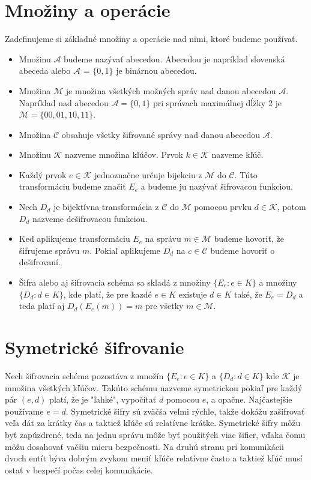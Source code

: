 \section{Množiny a operácie}
	Zadefinujeme si základné množiny a operácie nad nimi, ktoré budeme používať.
	\begin{itemize}
	\item Množinu $\mathcal A$ budeme nazývať abecedou. Abecedou je napríklad slovenská abeceda alebo $\mathcal A$ =  $\{0,1\}$ je binárnou abecedou.
	\item Množina $\mathcal M$ je množina všetkých možných správ nad danou abecedou $\mathcal A$. Napríklad nad abecedou $\mathcal A = \{0,1\}$ pri správach maximálnej dĺžky 2 je  $ \mathcal M = \{00,01,10,11\}$.
	\item Množina $\mathcal C$ obsahuje všetky šifrované správy nad danou abecedou $\mathcal A$.  
	\item Množinu $\mathcal K$ nazveme množina kľúčov. Prvok $k \in\mathcal K$ nazveme kľúč.
	\item Každý prvok $e \in \mathcal K$ jednoznačne určuje bijekciu z $\mathcal M$ do $\mathcal C$. Túto transformáciu budeme značiť $E_e$ a budeme ju nazývať šifrovacou funkciou.
	\item Nech $D_d$ je bijektívna transformácia z $\mathcal C$ do $\mathcal M$ pomocou prvku  $d \in \mathcal K$, potom  $D_d$ nazveme dešifrovacou funkciou.
	\item Keď aplikujeme transformáciu $E_e$ na správu $m \in \mathcal M$ budeme hovoriť, že šifrujeme správu $m$. Pokiaľ aplikujeme $D_d$ na $c \in \mathcal C$ budeme hovoriť o dešifrovaní.
	\item Šifra alebo aj šifrovacia schéma sa skladá z množiny $\{E_e : e \in K\}$ a množiny $\{D_d : d \in K\}$, kde platí, že pre kazdé $e \in K$ existuje $d \in K$ také, že $E_e = D_d$ a teda platí aj $D_d(E_e(m)) = m$ pre všetky $m \in \mathcal M$.  
	\end{itemize}

		
\section{Symetrické šifrovanie}
	Nech šifrovacia schéma pozostáva z množín $\{E_e : e \in K\}$ a $\{D_d: d \in K\}$ kde $\mathcal K$ je množina všetkých kľúčov. Takúto schému nazveme symetrickou pokiaľ pre každý pár $(e,d)$ platí, že je "ľahké", vypočítať $d$ pomocou $e$, a opačne. Najčastejšie používame $e = d$. Symetrické šifry sú zväčša veľmi rýchle, takže dokážu zašifrovať veľa dát za krátky čas a taktiež kľúče sú relatívne krátke. Symetrické šifry môžu byť zapúzdrené, teda na jednu správu môže byť použitých viac šifier, vďaka čomu môžu dosahovať vačšiu mieru bezpečnosti. Na druhú stranu pri komunikácii dvoch entít býva dobrým zvykom meniť kľúče relatívne často a taktiež kľúč musí ostať v bezpečí počas celej komunikácie.

